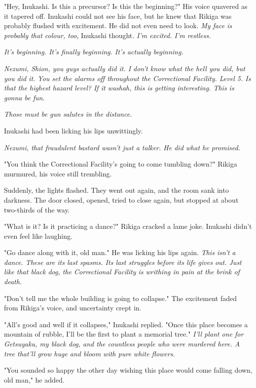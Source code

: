 "Hey, Inukashi. Is this a precursor? Is this the beginning?" His voice
quavered as it tapered off. Inukashi could not see his face, but he knew
that Rikiga was probably flushed with excitement. He did not even need
to look. \emph{My face is probably that colour, too}, Inukashi thought. \emph{I'm
excited. I'm restless.}

\emph{It's beginning. It's finally beginning. It's actually beginning.}

\emph{Nezumi, Shion, you guys actually did it. I don't know what the hell you
did, but you did it. You set the alarms off throughout the Correctional
Facility. Level 5. Is that the highest hazard level? If it was\el hah,
this is getting interesting. This is gonna be fun.}

\emph{Those must be gun salutes in the distance.}

Inukashi had been licking his lips unwittingly.

\emph{Nezumi, that fraudulent bastard wasn't just a talker. He did what he
promised.}

"You think the Correctional Facility's going to come tumbling down?"
Rikiga murmured, his voice still trembling.

Suddenly, the lights flashed. They went out again, and the room sank
into darkness. The door closed, opened, tried to close again, but
stopped at about two-thirds of the way.

"What is it? Is it practicing a dance?" Rikiga cracked a lame joke.
Inukashi didn't even feel like laughing.

"Go dance along with it, old man." He was licking his lips again. \emph{This
isn't a dance. These are its last spasms. Its last struggles before its
life gives out. Just like that black dog, the Correctional Facility is
writhing in pain at the brink of death.}

\mybreak

"Don't tell me the whole building is going to collapse." The excitement
faded from Rikiga's voice, and uncertainty crept in.

"All's good and well if it collapses," Inukashi replied. "Once this
place becomes a mountain of rubble, I'll be the first to plant a
memorial tree." \emph{I'll plant one for Getsuyaku, my black dog, and the
countless people who were murdered here. A tree that'll grow huge and
bloom with pure white flowers.}

"You sounded so happy the other day wishing this place would come
falling down, old man," he added.

